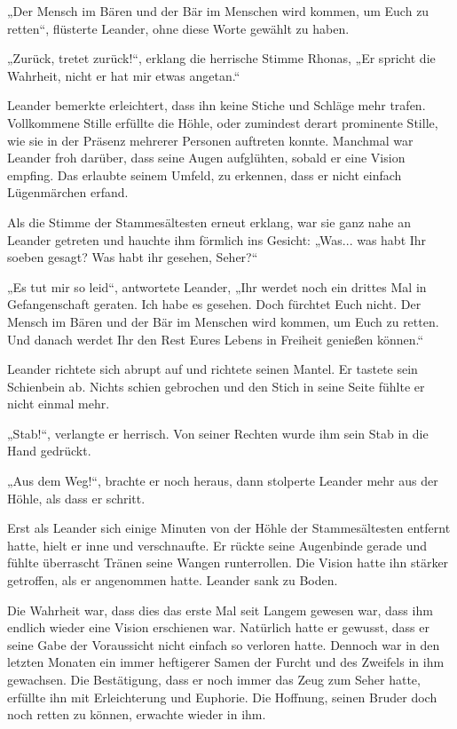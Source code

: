 „Der Mensch im Bären und der Bär im Menschen wird kommen, um Euch zu retten“, flüsterte Leander, ohne diese Worte gewählt zu haben.

„Zurück, tretet zurück!“, erklang die herrische Stimme Rhonas, „Er spricht die Wahrheit, nicht er hat mir etwas angetan.“

Leander bemerkte erleichtert, dass ihn keine Stiche und Schläge mehr trafen. Vollkommene Stille erfüllte die Höhle, oder zumindest derart prominente Stille, wie sie in der Präsenz mehrerer Personen auftreten konnte. Manchmal war Leander froh darüber, dass seine Augen aufglühten, sobald er eine Vision empfing. Das erlaubte seinem Umfeld, zu erkennen, dass er nicht einfach Lügenmärchen erfand.

Als die Stimme der Stammesältesten erneut erklang, war sie ganz nahe an Leander getreten und hauchte ihm förmlich ins Gesicht: „Was... was habt Ihr soeben gesagt? Was habt ihr gesehen, Seher?“

„Es tut mir so leid“, antwortete Leander, „Ihr werdet noch ein drittes Mal in Gefangenschaft geraten. Ich habe es gesehen. Doch fürchtet Euch nicht. Der Mensch im Bären und der Bär im Menschen wird kommen, um Euch zu retten. Und danach werdet Ihr den Rest Eures Lebens in Freiheit genießen können.“

Leander richtete sich abrupt auf und richtete seinen Mantel. Er tastete sein Schienbein ab. Nichts schien gebrochen und den Stich in seine Seite fühlte er nicht einmal mehr.

„Stab!“, verlangte er herrisch. Von seiner Rechten wurde ihm sein Stab in die Hand gedrückt.

„Aus dem Weg!“, brachte er noch heraus, dann stolperte Leander mehr aus der Höhle, als dass er schritt.\bigskip







Erst als Leander sich einige Minuten von der Höhle der Stammesältesten entfernt hatte, hielt er inne und verschnaufte. Er rückte seine Augenbinde gerade und fühlte überrascht Tränen seine Wangen runterrollen. Die Vision hatte ihn stärker getroffen, als er angenommen hatte. Leander sank zu Boden.

Die Wahrheit war, dass dies das erste Mal seit Langem gewesen war, dass ihm endlich wieder eine Vision erschienen war. Natürlich hatte er gewusst, dass er seine Gabe der Voraussicht nicht einfach so verloren hatte. Dennoch war in den letzten Monaten ein immer heftigerer Samen der Furcht und des Zweifels in ihm gewachsen. Die Bestätigung, dass er noch immer das Zeug zum Seher hatte, erfüllte ihn mit Erleichterung und Euphorie. Die Hoffnung, seinen Bruder doch noch retten zu können, erwachte wieder in ihm.

